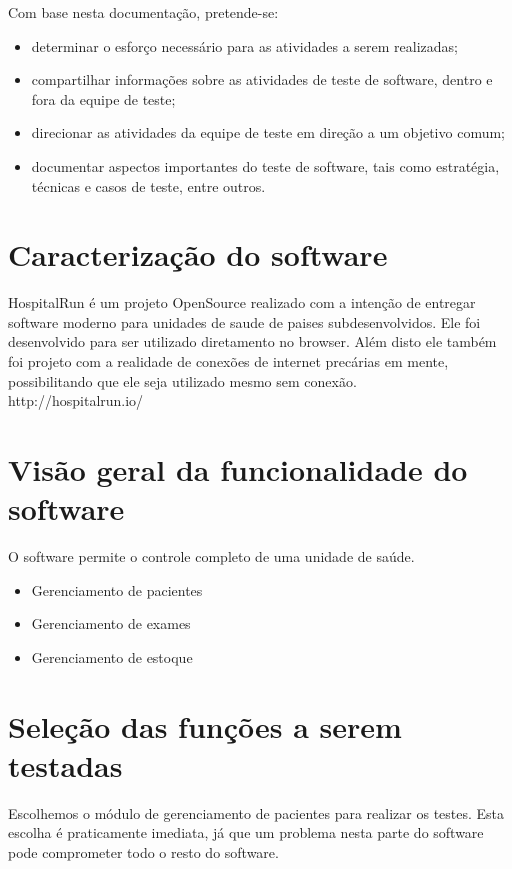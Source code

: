Com base nesta documentação, pretende-se:
\begin{itemize}
\item determinar o esforço necessário para as atividades a serem realizadas;
\item compartilhar informações sobre as atividades de teste de software, dentro
    e fora da equipe de teste;
\item direcionar as atividades da equipe de teste em direção a um objetivo comum;
\item documentar aspectos importantes do teste de software, tais como
    estratégia, técnicas e casos de teste, entre outros.
\end{itemize}

\section*{Caracterização do software}
HospitalRun é um projeto OpenSource realizado com a intenção de entregar
software moderno para unidades de saude de paises subdesenvolvidos.
Ele foi desenvolvido para ser utilizado diretamento no browser. Além disto ele
também foi projeto com a realidade de conexões de internet precárias em mente,
possibilitando que ele seja utilizado mesmo sem conexão.
\\
http://hospitalrun.io/


\section*{Visão geral da funcionalidade do software}
O software permite o controle completo de uma unidade de saúde.

\begin{itemize}
\item Gerenciamento de pacientes
\item Gerenciamento de exames
\item Gerenciamento de estoque
\end{itemize}

\section*{Seleção das funções a serem testadas}
Escolhemos o módulo de gerenciamento de pacientes para realizar os testes.
Esta escolha é praticamente imediata, já que um problema nesta parte do
software pode comprometer todo o resto do software.

